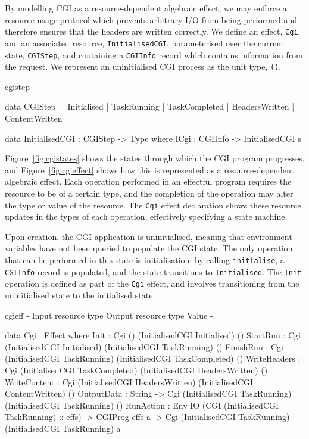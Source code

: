 By modelling CGI as a resource-dependent algebraic effect, we may enforce a
resource usage protocol which
prevents arbitrary I/O from being performed and therefore
ensures that the headers are written correctly. We
define an effect, \texttt{Cgi}, and an associated resource,
\texttt{InitialisedCGI}, parameterised over the current state,
\texttt{CGIStep}, and containing a
\texttt{CGIInfo} record which contains information from the request. We
represent an uninitialised CGI process as the unit type, \texttt{()}.

\begin{SaveVerbatim}{cgistep}

data CGIStep = Initialised   | TaskRunning 
             | TaskCompleted | HeadersWritten 
             | ContentWritten

data InitialisedCGI : CGIStep -> Type where
     ICgi : CGIInfo -> InitialisedCGI s

\end{SaveVerbatim}

\noindent
Figure~\ref{fig:cgistates} shows the states through which the CGI program
progresses, and Figure~\ref{fig:cgieffect} shows how this is represented
as a resource-dependent algebraic effect. Each operation performed in an effectful
program requires the resource to be of a certain type, and the completion of
the operation may alter the type or value of the resource. The \texttt{Cgi}
effect declaration shows these resource updates in the types of each operation,
effectively specifying a state machine.

Upon creation, the CGI application is uninitialised, meaning that environment variables have not been queried to populate the CGI state. The only operation
that can be performed in this state is initialisation: by calling
\texttt{initialise}, a \texttt{CGIInfo} record is populated, and the state transitions
to \texttt{Initialised}. The \texttt{Init} operation is defined as part of the
\texttt{Cgi} effect, and involves transitioning from the uninitialised state to
the initialised state.

\begin{SaveVerbatim}{cgieff}
{-                     { Input resource type }         { Output resource type }        { Value } -}

data Cgi : Effect where
    Init         : Cgi ()                              (InitialisedCGI Initialised)    ()
    StartRun     : Cgi (InitialisedCGI Initialised)    (InitialisedCGI TaskRunning)    ()
    FinishRun    : Cgi (InitialisedCGI TaskRunning)    (InitialisedCGI TaskCompleted)  ()
    WriteHeaders : Cgi (InitialisedCGI TaskCompleted)  (InitialisedCGI HeadersWritten) ()
    WriteContent : Cgi (InitialisedCGI HeadersWritten) (InitialisedCGI ContentWritten) ()
    OutputData   : String -> 
                   Cgi (InitialisedCGI TaskRunning)    (InitialisedCGI TaskRunning)    ()
    RunAction    : Env IO (CGI (InitialisedCGI TaskRunning) :: effs) -> CGIProg effs a -> 
                   Cgi (InitialisedCGI TaskRunning)    (InitialisedCGI TaskRunning)    a
\end{SaveVerbatim}

